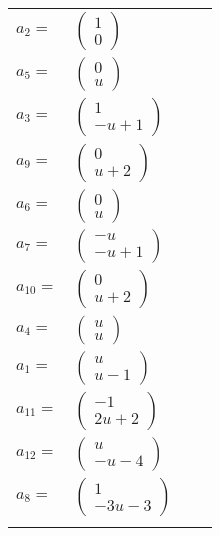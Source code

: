 \documentclass[1p]{elsarticle_modified}
\theoremstyle{definition}
\begin{document}
\begin{tabular}{m{7pt} m{180pt} m{7pt} m{180pt} }
\flushright $a_{2}=$&$\begin{pmatrix}1\\0\end{pmatrix}$ \\
\flushright $a_{5}=$&$\begin{pmatrix}0\\u\end{pmatrix}$ \\
\flushright $a_{3}=$&$\begin{pmatrix}1\\- u+1\end{pmatrix}$ \\
\flushright $a_{9}=$&$\begin{pmatrix}0\\u+2\end{pmatrix}$ \\
\flushright $a_{6}=$&$\begin{pmatrix}0\\u\end{pmatrix}$ \\
\flushright $a_{7}=$&$\begin{pmatrix}- u\\- u+1\end{pmatrix}$ \\
\flushright $a_{10}=$&$\begin{pmatrix}0\\u+2\end{pmatrix}$ \\
\flushright $a_{4}=$&$\begin{pmatrix}u\\u\end{pmatrix}$ \\
\flushright $a_{1}=$&$\begin{pmatrix}u\\u-1\end{pmatrix}$ \\
\flushright $a_{11}=$&$\begin{pmatrix}-1\\2 u+2\end{pmatrix}$ \\
\flushright $a_{12}=$&$\begin{pmatrix}u\\- u-4\end{pmatrix}$ \\
\flushright $a_{8}=$&$\begin{pmatrix}1\\-3 u-3\end{pmatrix}$\\&\end{tabular}
\end{document}
